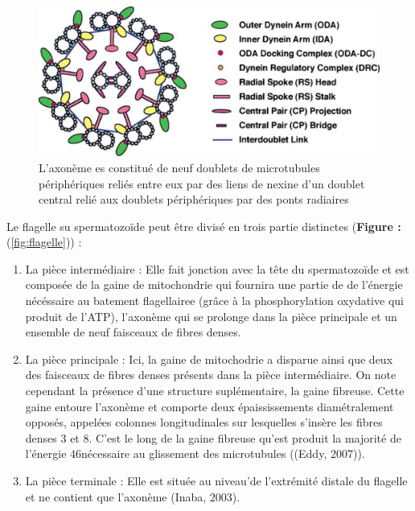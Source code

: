 \documentclass[12pt,twoside]{reedthesis}
\providecommand{\tightlist}{%
  \setlength{\itemsep}{0pt}\setlength{\parskip}{0pt}}
\theoremstyle{definition}
\theoremstyle{definition}
\theoremstyle{remark}
\begin{document}
  \begin{figure}
  
  {\centering \includegraphics[scale=.3]{figure/axoneme} 
  
  }
  
  \caption[Structure simplifiée de l'axonème d'après Inaba (2003)]{L'axonème es constitué de neuf doublets de microtubules périphériques reliés entre eux par des liens de nexine d'un doublet central relié aux doublets périphériques par des ponts radiaires}\label{fig:axoneme}
  \end{figure}
  
  Le flagelle su spermatozoïde peut être divisé en trois partie distinctes
  (\textbf{Figure : }(\ref{fig:flagelle})) :
  
  \begin{enumerate}
  \def\labelenumi{\arabic{enumi}.}
  \tightlist
  \item
    La pièce intermédiaire : Elle fait jonction avec la tête du
    spermatozoïde et est composée de la gaine de mitochondrie qui fournira
    une partie de de l'énergie nécéssaire au batement flagellairee (grâce
    à la phosphorylation oxydative qui produit de l'ATP), l'axonème qui se
    prolonge dans la pièce principale et un ensemble de neuf faisceaux de
    fibres denses.\\
  \item
    La pièce principale : Ici, la gaine de mitochodrie a disparue ainsi
    que deux des faisceaux de fibres denses présents dans la pièce
    intermédiaire. On note cependant la présence d'une structure
    suplémentaire, la gaine fibreuse. Cette gaine entoure l'axonème et
    comporte deux épaississements diamétralement opposés, appelées
    colonnes longitudinales sur lesquelles s'insère les fibres denses 3 et
    8. C'est le long de la gaine fibreuse qu'est produit la majorité de
    l'énergie 46nécessaire au glissement des microtubules ((Eddy,
    2007)).\\
  \item
    La pièce terminale : Elle est située au niveau'de l'extrémité distale
    du flagelle et ne contient que l'axonème (Inaba, 2003).
  \end{enumerate}
  
\end{document}
